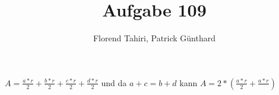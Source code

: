 \documentclass[11pt,a4paper]{article}
\title{Aufgabe 109}
\author{Florend Tahiri, Patrick Günthard}
\begin{document}
	\maketitle
	
	\(A = \frac{a*r}{2} + \frac{b*r}{2} + \frac{c*r}{2} + \frac{d*r}{2}\) und da \(a + c = b + d\) kann \(A = 2 * (\frac{a*r}{2} + \frac{a*r}{} )\)
\end{document}
